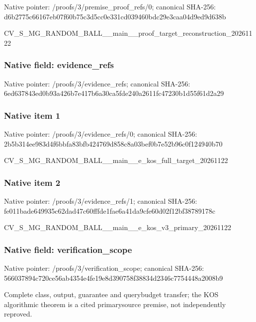 \documentclass[10pt,a4paper]{article}
\begin{document}
Native pointer: /proofs/3/premise\_proof\_refs/0; canonical SHA-256: d6b2775c66167eb07f60b75c\allowbreak{}3d5cc0e331cd039460bdc29e\allowbreak{}3caa04d9ed9d638b


CV\_S\_MG\_RANDOM\_BALL\_\_mai\allowbreak{}n\_\_proof\_target\_reconstr\allowbreak{}uction\_20261122


\subsubsection{Native field: evidence\_refs}


Native pointer: /proofs/3/evidence\_refs; canonical SHA-256: 6ed637843ed0b93a426b7e41\allowbreak{}7b6a30ca5fde240a2611fc47\allowbreak{}230b1d55f61d2a29



\subsubsection{Native item 1}


Native pointer: /proofs/3/evidence\_refs/0; canonical SHA-256: 2b5b314ee983d4f6bbfa83bf\allowbreak{}b424769d858c8a03bef0b7e5\allowbreak{}2b96c0f124940b70


CV\_S\_MG\_RANDOM\_BALL\_\_mai\allowbreak{}n\_\_e\_kos\_full\_target\_202\allowbreak{}61122


\subsubsection{Native item 2}


Native pointer: /proofs/3/evidence\_refs/1; canonical SHA-256: fe011bade649935c62dad47c\allowbreak{}60fffde1fae6a41da9cfe60d\allowbreak{}02f12bf38789178c


CV\_S\_MG\_RANDOM\_BALL\_\_mai\allowbreak{}n\_\_e\_kos\_v3\_primary\_2026\allowbreak{}1122


\subsubsection{Native field: verification\_scope}


Native pointer: /proofs/3/verification\_scope; canonical SHA-256: 566037894c720ce56ab4354e\allowbreak{}4fe19e8d390758f38834d234\allowbreak{}6c7754448a2008b9


Complete class, output, guarantee and querybudget transfer; the KOS algorithmic theorem is a cited primarysource premise, not independently reproved.
\end{document}
